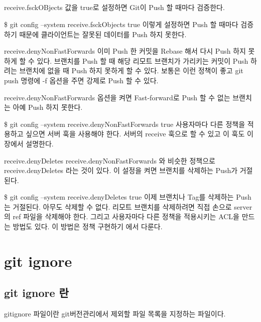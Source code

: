 \documentclass[12pt, a4paper, oneside]{book}
\let\stdsection\section
\renewcommand\section{\newpage\stdsection}
\begin{document}
\paragraph{}
receive.fsckOBjects 값을 true로 설정하면 Git이 Push 할 때마다 검증한다.

\$ git config --system receive.fsckObjects true
이렇게 설정하면 Push 할 때마다 검증하기 때문에 클라이언트는 잘못된 데이터를 Push 하지 못한다.

receive.denyNonFastForwards
이미 Push 한 커밋을 Rebase 해서 다시 Push 하지 못하게 할 수 있다. 브랜치를 Push 할 때 해당 리모트 브랜치가 가리키는 커밋이 Push 하려는 브랜치에 없을 때 Push 하지 못하게 할 수 있다. 보통은 이런 정책이 좋고 git push 명령에 -f 옵션을 주면 강제로 Push 할 수 있다.

receive.denyNonFastForwards 옵션을 켜면 Fast-forward로 Push 할 수 없는 브랜치는 아예 Push 하지 못한다.

\$ git config --system receive.denyNonFastForwards true
사용자마다 다른 정책을 적용하고 싶으면 서버 훅을 사용해야 한다. 서버의 receive 훅으로 할 수 있고 이 훅도 이 장에서 설명한다.

receive.denyDeletes
receive.denyNonFastForwards 와 비슷한 정책으로 receive.denyDeletes 라는 것이 있다. 이 설정을 켜면 브랜치를 삭제하는 Push가 거절된다.

\$ git config --system receive.denyDeletes true
이제 브랜치나 Tag를 삭제하는 Push는 거절된다. 아무도 삭제할 수 없다. 리모트 브랜치를 삭제하려면 직접 손으로 server의 ref 파일을 삭제해야 한다. 그리고 사용자마다 다른 정책을 적용시키는 ACL을 만드는 방법도 있다. 이 방법은 정책 구현하기 에서 다룬다.



	\chapter 	{git ignore}

	\noptcrule
	\minitoc
				

%										
	\section{git ignore 란}


gitignore 파일이란 git버전관리에서 제외할 파일 목록을 지정하는 파일이다.
\end{document}
